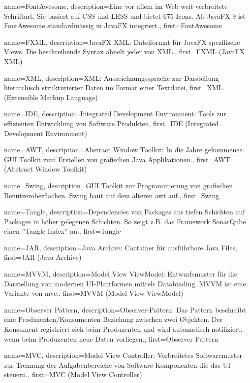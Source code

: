 {
	name={FontAwesome},
	description={Eine vor allem im Web weit verbreitete Schriftart. Sie basiert auf CSS und LESS und bietet 675 Icons. Ab JavaFX 9 ist FontAwesome standardmässig in JavaFX integriert.},
	first={FontAwesome}
}

{
	name={FXML},
	description={JavaFX XML: Dateiformat für JavaFX spezifische Views. Die beschreibende Syntax ähnelt jeder von XML.},
	first={FXML (JavaFX XML)}
}

{
	name={XML},
	description={XML: Auszeichnungssprache zur Darstellung hierarchisch strukturierter Daten im Format einer Textdatei},
	first={XML (Extensible Markup Language)}
}

{
	name={IDE},
	description={Integrated Development Environment: Tools zur effizienten Entwicklung von Software Produkten},
	first={IDE (Integrated Development Environment)}
}

{
	name={AWT},
	description={Abstract Window Toolkit: In die Jahre gekommenes GUI Toolkit zum Erstellen von grafischen Java Applikationen.},
	first={AWT (Abstract Window Toolkit)}
}

{
	name={Swing},
	description={GUI Toolkit zur Programmierung von grafischen Benutzeroberflächen. Swing baut auf dem älteren \gls{awt} auf.},
	first={Swing}
}

{
	name={Tangle},
	description={Dependencies von Packages aus tiefen Schichten auf Packages in höher gelegenen Schichten. So zeigt z.B. das Framework SonarQube einen ''Tangle Index'' an.},
	first={Tangle}
}


{
	name={JAR},
	description={Java Archive: Container für ausführbare Java Files},
	first={JAR (Java Archive)}
}

{
	name={MVVM},
	description={Model View ViewModel: Entwurfsmuster für die Darstellung von modernen UI-Plattformen mittels Databinding. MVVM ist eine Variante von \gls{mvc}.},
	first={MVVM (Model View ViewModel)}
}

{
	name={Observer Pattern},
	description={Observer-Pattern: Das Pattern beschreibt eine Produzenten/Konsumenten Beziehung zwischen zwei Objekten. Der Konsument registriert sich beim Produzenten und wird automatisch notifiziert, wenn beim Produzenten neue Daten vorliegen.},
	first={Observer Pattern}
}

{
	name={MVC},
	description={Model View Controller: Verbreitetes Softwaremuster zur Trennung der Aufgabenbereiche von Software Komponenten die das UI steuern.},
	first={MVC (Model View Controller)}
}

